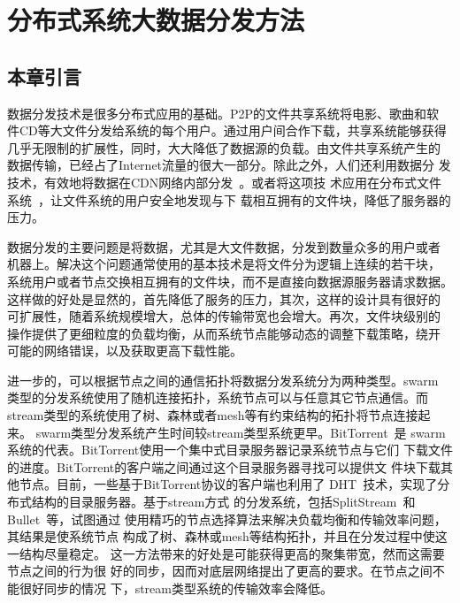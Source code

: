 \chapter{分布式系统大数据分发方法}
\label{chap:bt}

\section{本章引言}


数据分发技术是很多分布式应用的基础。P2P的文件共享系统将电影、歌曲和软
件CD等大文件分发给系统的每个用户。通过用户间合作下载，共享系统能够获得
几乎无限制的扩展性，同时，大大降低了数据源的负载。由文件共享系统产生的
数据传输，已经占了Internet流量的很大一部分。除此之外，人们还利用数据分
发技术，有效地将数据在CDN网络内部分发~\cite{fastreplica}。或者将这项技
术应用在分布式文件系统~\cite{sharkfs}，让文件系统的用户安全地发现与下
载相互拥有的文件块，降低了服务器的压力。

数据分发的主要问题是将数据，尤其是大文件数据，分发到数量众多的用户或者
机器上。解决这个问题通常使用的基本技术是将文件分为逻辑上连续的若干块，
系统用户或者节点交换相互拥有的文件块，而不是直接向数据源服务器请求数据。
这样做的好处是显然的，首先降低了服务的压力，其次，这样的设计具有很好的
可扩展性，随着系统规模增大，总体的传输带宽也会增大。再次，文件块级别的
操作提供了更细粒度的负载均衡，从而系统节点能够动态的调整下载策略，绕开
可能的网络错误，以及获取更高下载性能。

进一步的，可以根据节点之间的通信拓扑将数据分发系统分为两种类型。swarm
类型的分发系统使用了随机连接拓扑，系统节点可以与任意其它节点通信。而
stream类型的系统使用了树、森林或者mesh等有约束结构的拓扑将节点连接起来。
swarm类型分发系统产生时间较stream类型系统更早。BitTorrent~\cite{bt}是
swarm系统的代表。BitTorrent使用一个集中式目录服务器记录系统节点与它们
下载文件的进度。BitTorrent的客户端之间通过这个目录服务器寻找可以提供文
件块下载其他节点。目前，一些基于BitTorrent协议的客户端也利用了
DHT~\cite{cademlia}技术，实现了分布式结构的目录服务器。基于stream方式
的分发系统，包括SplitStream~\cite{xxx}和Bullet~\cite{xxx}等，试图通过
使用精巧的节点选择算法来解决负载均衡和传输效率问题，其结果是使系统节点
构成了树、森林或mesh等结构拓扑，并且在分发过程中使这一结构尽量稳定。
这一方法带来的好处是可能获得更高的聚集带宽，然而这需要节点之间的行为很
好的同步，因而对底层网络提出了更高的要求。在节点之间不能很好同步的情况
下，stream类型系统的传输效率会降低。

